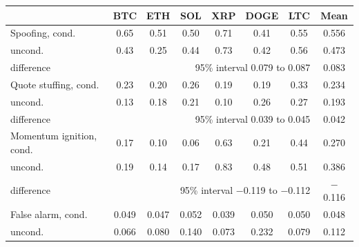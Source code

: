\begin{tabular}{lccccccc}
\toprule
& BTC & ETH & SOL & XRP & DOGE & LTC & Mean \\
\midrule
Spoofing, cond. & 0.65 & 0.51 & 0.50 & 0.71 & 0.41 & 0.55 & 0.556 \\
\quad uncond. & 0.43 & 0.25 & 0.44 & 0.73 & 0.42 & 0.56 & 0.473 \\
\quad difference & \multicolumn{6}{r}{95\% interval 0.079 to 0.087} & 0.083 \\
Quote stuffing, cond. & 0.23 & 0.20 & 0.26 & 0.19 & 0.19 & 0.33 & 0.234 \\
\quad uncond. & 0.13 & 0.18 & 0.21 & 0.10 & 0.26 & 0.27 & 0.193 \\
\quad difference & \multicolumn{6}{r}{95\% interval 0.039 to 0.045} & 0.042 \\
Momentum ignition, cond. & 0.17 & 0.10 & 0.06 & 0.63 & 0.21 & 0.44 & 0.270 \\
\quad uncond. & 0.19 & 0.14 & 0.17 & 0.83 & 0.48 & 0.51 & 0.386 \\
\quad difference & \multicolumn{6}{r}{95\% interval $-$0.119 to $-$0.112} & $-$0.116 \\
\midrule
False alarm, cond. & 0.049 & 0.047 & 0.052 & 0.039 & 0.050 & 0.050 & 0.048 \\
\quad uncond. & 0.066 & 0.080 & 0.140 & 0.073 & 0.232 & 0.079 & 0.112 \\
\bottomrule
\end{tabular}
